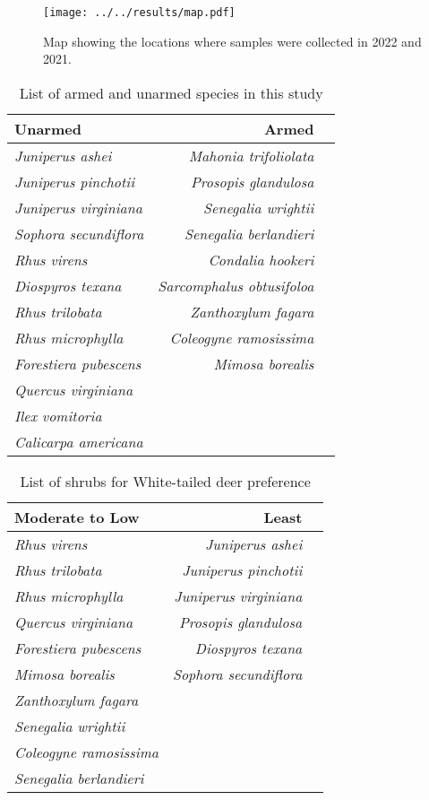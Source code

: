 \documentclass{ttuthes2007}
\begin{document}
 \begin{figure}
     \centering
     \texttt{[image: ../../results/map.pdf]}
     \caption{Map showing the locations where samples were collected in 2022 and 2021.}
 \end{figure}
\begin{table}
    \centering
    \caption{List of armed and unarmed species in this study}
    \begin{tabular}{lrr}
          Unarmed &  Armed \\
          \hline
          \emph{Juniperus ashei} & \emph{Mahonia trifoliolata}\\
          \emph{Juniperus pinchotii} & \emph{Prosopis glandulosa}\\
          \emph{Juniperus virginiana} & \emph{Senegalia wrightii}\\
          \emph{Sophora secundiflora} & \emph{Senegalia berlandieri}\\
          \emph{Rhus virens} & \emph{Condalia hookeri}\\
          \emph{Diospyros texana} & \emph{Sarcomphalus obtusifoloa}\\
          \emph{Rhus trilobata} & \emph{Zanthoxylum fagara}\\
          \emph{Rhus microphylla} & \emph{Coleogyne ramosissima}\\
          \emph{Forestiera pubescens} & \emph{Mimosa borealis}\\
          \emph{Quercus virginiana} &   \\
          \emph{Ilex vomitoria} &    \\
          \emph{Calicarpa americana} & \\
    \end{tabular}
\end{table} 
\begin{table}
    \centering
    \caption{List of shrubs for White-tailed deer preference \citep*{wright2003white}}
    \begin{tabular}{lrr}
     Moderate to Low & Least \\
     \hline
    \emph{Rhus virens} & \emph{Juniperus ashei} \\
    \emph{Rhus trilobata} & \emph{Juniperus pinchotii}\\
    \emph{Rhus microphylla} & \emph{Juniperus virginiana}\\
    \emph{Quercus virginiana} & \emph{Prosopis glandulosa}\\
    \emph{Forestiera pubescens} & \emph{Diospyros texana}\\
    \emph{Mimosa borealis} & \emph{Sophora secundiflora}\\
    \emph{Zanthoxylum fagara} &   \\
    \emph{Senegalia wrightii} & \\
    \emph{Coleogyne ramosissima} & \\
    \emph{Senegalia berlandieri} & \\
    \end{tabular}
\end{table} 
\end{document}
